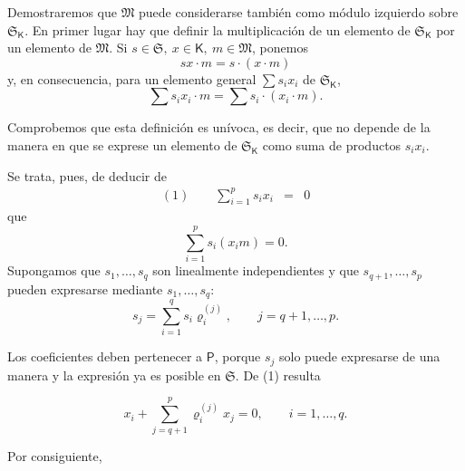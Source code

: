 Demostraremos que \(\mathfrak M\) puede considerarse también como módulo izquierdo sobre \(\mathfrak S_{\mathsf K}\). En primer lugar hay que definir la multiplicación de un elemento de \(\mathfrak S_{\mathsf K}\) por un elemento de \(\mathfrak M\). Si \(s\in\mathfrak S,\ x\in\mathsf K,\ m\in\mathfrak M\), ponemos
\[
sx\cdot m=s\cdot(x\cdot m)
\]
y, en consecuencia, para un elemento general \(\sum s_ix_i\) de \(\mathfrak S_{\mathsf K}\),
\[
\sum s_ix_i\cdot m=\sum s_i\cdot(x_i\cdot m).
\]

Comprobemos que esta definición es unívoca, es decir, que no depende de la manera en que se exprese un elemento de \(\mathfrak S_{\mathsf K}\) como suma de productos \(s_ix_i\).

Se trata, pues, de deducir de
\[
\begin{array}{rcl}
(1)\qquad \displaystyle\sum_{i=1}^{p}s_ix_i&=&0
\end{array}
\]
que
\[
\sum_{i=1}^{p}s_i(x_i m)=0.
\]
Supongamos que \(s_1,\ldots,s_q\) son linealmente independientes y que \(s_{q+1},\ldots,s_p\) pueden expresarse mediante \(s_1,\ldots,s_q\):
\[
s_j=\sum_{i=1}^{q}s_i\varrho_i^{(j)},\qquad j=q+1,\ldots,p.
\]

Los coeficientes deben pertenecer a \(\mathsf P\), porque \(s_j\) solo puede expresarse de una manera y la expresión ya es posible en \(\mathfrak S\). De (1) resulta

\[
x_i+\sum_{j=q+1}^{p}\varrho_i^{(j)}x_j=0,\qquad i=1,\ldots,q.
\]

Por consiguiente,

